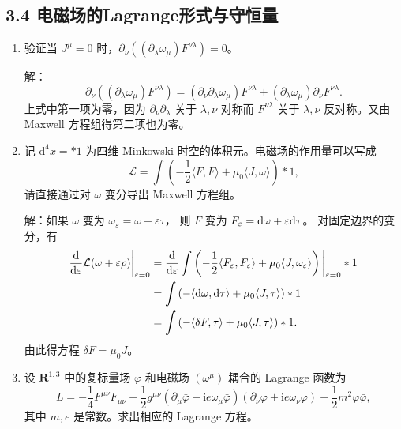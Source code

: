 \subsection{3.4 电磁场的Lagrange形式与守恒量}
\begin{enumerate}
\item 验证当 $J^\mu=0$ 时，$\partial_\nu((\partial_\lambda \omega_\mu) F^{\nu \lambda})=0$。

解：$$\partial_{\nu}((\partial_{\lambda} \omega_{\mu}) F^{\nu \lambda})
=(\partial_{\nu} \partial_{\lambda} \omega_{\mu}) F^{\nu \lambda}
+(\partial_{\lambda} \omega_{\mu}) \partial_{\nu} F^{\nu \lambda}.$$
上式中第一项为零，因为 $\partial_{\nu} \partial_{\lambda}$ 关于 $\lambda, \nu$ 对称而 $F^{\nu \lambda}$ 关于 $\lambda, \nu$ 反对称。又由 Maxwell 方程组得第二项也为零。

\item 记 $\mathrm{d}^4 x=* 1$ 为四维 Minkowski 时空的体积元。电磁场的作用量可以写成
$$\mathcal{L}=\int\left(-\frac{1}{2}\langle F, F\rangle
+\mu_0\langle J, \omega\rangle\right) * 1,$$
请直接通过对 $\omega$ 变分导出 Maxwell 方程组。

解：如果 $\omega$ 变为 $\omega_{\varepsilon}=\omega+\varepsilon \tau$，
则 $F$ 变为 $F_{\varepsilon}={\rm d} \omega+\varepsilon {\rm d} \tau$。
对固定边界的变分，有
\begin{align*}
\frac{\mathrm{d}}{{\rm d} \varepsilon} \mathcal{L}(\omega+\varepsilon \rho)\bigg|_{\varepsilon=0}
& =\frac{\mathrm{d}}{{\rm d} \varepsilon} \int\left(-\frac{1}{2}\langle F_{\varepsilon}, F_{\varepsilon}\rangle+\mu_{0}\langle J, \omega_{\varepsilon}\rangle\right)\bigg|_{\varepsilon=0} * 1 \\
& =\int\left(-\langle{\rm d} \omega, {\rm d} \tau\rangle+\mu_{0}\langle J, \tau\rangle\right) * 1 \\
& =\int\left(-\langle\delta F, \tau\rangle+\mu_{0}\langle J, \tau\rangle\right) * 1 .
\end{align*}
由此得方程 $\delta F=\mu_{0} J$。

\item 设 $\mathbf{R}^{1,3}$ 中的复标量场 $\varphi$ 和电磁场 $(\omega^\mu)$ 耦合的 Lagrange 函数为
$$L=-\frac{1}{4}F^{\mu\nu}F_{\mu\nu}+\frac{1}{2}g^{\mu\nu}(\partial_\mu\bar{\varphi}-\mathrm{i}e\omega_\mu\bar{\varphi})
(\partial_\nu\varphi+\mathrm{i}e\omega_\nu\varphi)-\frac{1}{2}m^2\varphi \bar{\varphi},$$
其中 $m, e$ 是常数。求出相应的 Lagrange 方程。


\end{enumerate}
